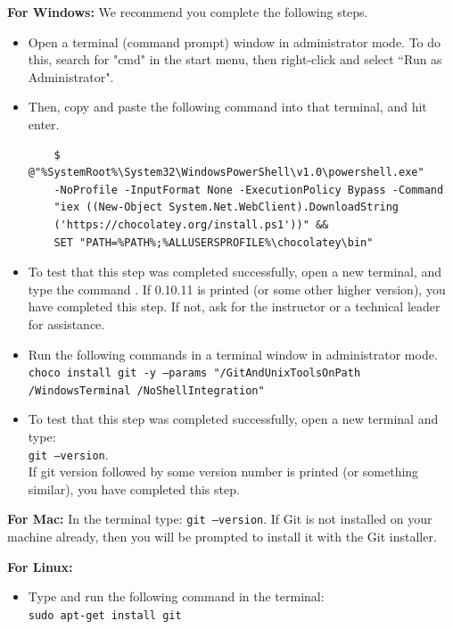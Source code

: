 \begin{enumerate}
  \textbf{For Windows:} %
   We recommend you complete the following steps.
  \begin{itemize}
  	\item Open a terminal (command prompt) window in administrator mode. To do this, search for "cmd" in the start menu, then right-click and select ``Run as Administrator". 
  	\item Then, copy and paste the following command into that terminal, and hit enter.   
  	\begin{verbatim}
  	$ @"%SystemRoot%\System32\WindowsPowerShell\v1.0\powershell.exe" 
  	-NoProfile -InputFormat None -ExecutionPolicy Bypass -Command 
  	"iex ((New-Object System.Net.WebClient).DownloadString
  	('https://chocolatey.org/install.ps1'))" && 
  	SET "PATH=%PATH%;%ALLUSERSPROFILE%\chocolatey\bin"
  	\end{verbatim}
	\item To test that this step was completed successfully, open a new terminal, and type the command . If 0.10.11 is printed (or some other higher version), you have completed this step. If not, ask for the instructor or a technical leader for assistance.
	\item Run the following commands in a terminal window in administrator mode. \\
	{\tt choco install git -y --params "/GitAndUnixToolsOnPath} \\
	{\tt /WindowsTerminal /NoShellIntegration"}
	\item To test that this step was completed successfully, open a new terminal and type: \\ {\tt git --version}. \\
	If git version followed by some version number is printed (or something similar), you have completed this step.
	\end{itemize}
	
  \textbf{For Mac:} In the terminal type: {\tt git --version}. If Git is not installed on your machine already, then you will be prompted to install it with the Git installer.
  
  \textbf{For Linux:} 
  \begin{itemize}
  	\item 
  	Type and run the following command in the terminal: \\
  	{\tt sudo apt-get install git}
  \end{itemize}


\end{enumerate}
